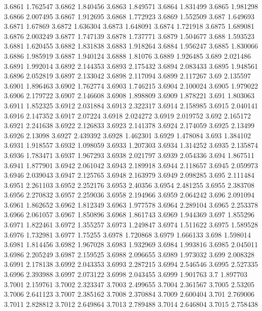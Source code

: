 3.6861  1.762547
3.6862  1.840456
3.6863  1.849571
3.6864  1.831499
3.6865  1.981298
3.6866  2.007495
3.6867  1.912695
3.6868  1.772923
3.6869  1.552509
3.687  1.649693
3.6871  1.67869
3.6872  1.636304
3.6873  1.648091
3.6874  1.721918
3.6875  1.689081
3.6876  2.003249
3.6877  1.747139
3.6878  1.737771
3.6879  1.504677
3.688  1.593523
3.6881  1.620455
3.6882  1.831838
3.6883  1.918264
3.6884  1.956247
3.6885  1.830066
3.6886  1.985919
3.6887  1.940124
3.6888  1.81076
3.6889  1.926485
3.689  2.021486
3.6891  1.992014
3.6892  2.144353
3.6893  2.175432
3.6894  2.083433
3.6895  1.948561
3.6896  2.052819
3.6897  2.133042
3.6898  2.117094
3.6899  2.117267
3.69  2.135597
3.6901  1.896463
3.6902  1.762774
3.6903  1.746215
3.6904  2.100024
3.6905  1.979022
3.6906  2.179722
3.6907  2.146608
3.6908  1.898809
3.6909  1.878221
3.691  1.803063
3.6911  1.852325
3.6912  2.031884
3.6913  2.322317
3.6914  2.158985
3.6915  2.040141
3.6916  2.147352
3.6917  2.07224
3.6918  2.024272
3.6919  2.019752
3.692  2.165172
3.6921  2.241638
3.6922  2.126833
3.6923  2.141378
3.6924  2.174059
3.6925  2.13499
3.6926  2.13098
3.6927  2.439392
3.6928  1.462301
3.6929  1.478084
3.693  1.384102
3.6931  1.918557
3.6932  1.098059
3.6933  1.207303
3.6934  1.314252
3.6935  2.135874
3.6936  1.783471
3.6937  1.967293
3.6938  2.021797
3.6939  2.054336
3.694  1.867511
3.6941  1.877901
3.6942  2.061042
3.6943  2.189918
3.6944  2.118657
3.6945  2.059973
3.6946  2.039043
3.6947  2.125765
3.6948  2.163979
3.6949  2.098285
3.695  2.111484
3.6951  2.261103
3.6952  2.252176
3.6953  2.40356
3.6954  2.481255
3.6955  2.383708
3.6956  2.270832
3.6957  2.259036
3.6958  2.194966
3.6959  2.064242
3.696  2.091094
3.6961  1.862652
3.6962  1.812349
3.6963  1.977578
3.6964  2.289104
3.6965  2.253378
3.6966  2.061057
3.6967  1.850896
3.6968  1.861743
3.6969  1.944369
3.697  1.855296
3.6971  1.822461
3.6972  1.355257
3.6973  1.249847
3.6974  1.511622
3.6975  1.589528
3.6976  1.732981
3.6977  1.75255
3.6978  1.720868
3.6979  1.666133
3.698  1.598014
3.6981  1.814456
3.6982  1.967028
3.6983  1.932969
3.6984  1.993816
3.6985  2.045011
3.6986  2.205249
3.6987  2.159525
3.6988  2.096655
3.6989  1.973032
3.699  2.008328
3.6991  2.178138
3.6992  2.043353
3.6993  2.287215
3.6994  2.546546
3.6995  2.527335
3.6996  2.393988
3.6997  2.073122
3.6998  2.043455
3.6999  1.901763
3.7  1.897703
3.7001  2.159761
3.7002  2.323347
3.7003  2.499655
3.7004  2.361567
3.7005  2.53205
3.7006  2.641123
3.7007  2.385162
3.7008  2.370884
3.7009  2.600404
3.701  2.769006
3.7011  2.828812
3.7012  2.649864
3.7013  2.789488
3.7014  2.646804
3.7015  2.758438
